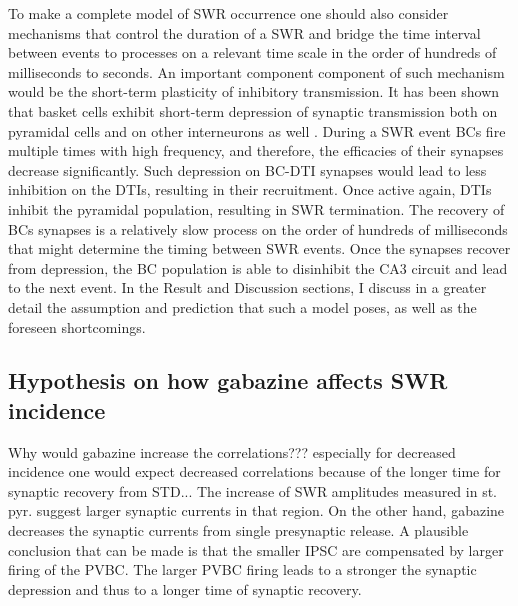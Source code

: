     To make a complete model of SWR occurrence one should also consider
    mechanisms that control the duration of a SWR and bridge the time interval
    between events to processes on a relevant time scale in the order of
    hundreds of milliseconds to seconds. An important component component of
    such mechanism would be the short-term plasticity of inhibitory
    transmission. It has been shown that basket cells exhibit short-term
    depression of synaptic transmission both on pyramidal cells and on other
    interneurons as well \citep{Kraushaar2000, Kohus2016}. During a SWR event
    BCs fire multiple times with high frequency, and therefore, the efficacies
    of their synapses decrease significantly. Such depression on BC-DTI
    synapses would lead to less inhibition on the DTIs, resulting in their
    recruitment. Once active again, DTIs inhibit the pyramidal population,
    resulting in SWR termination. The recovery of BCs synapses is a relatively
    slow process on the order of hundreds of milliseconds \citep{Kohus2016}
    that might determine the timing between SWR events. Once the synapses
    recover from depression, the BC population is able to disinhibit the CA3
    circuit and lead to the next event. In the Result and Discussion sections, I
    discuss in a greater detail the assumption and prediction that such a model
    poses, as well as the foreseen shortcomings.


  \subsection{Hypothesis on how gabazine affects SWR incidence} 

  
    Why would gabazine increase the correlations??? especially for decreased
    incidence one would expect decreased correlations because of the longer
    time for synaptic recovery from STD...  The increase of SWR amplitudes
    measured in st. pyr. suggest larger synaptic currents in that region. On
    the other hand, gabazine decreases the synaptic currents from single
    presynaptic release. A plausible conclusion that can be made is that the
    smaller IPSC are compensated by larger firing of the PVBC. The larger PVBC
    firing leads to a stronger the synaptic depression and thus to a longer
    time of synaptic recovery. 

